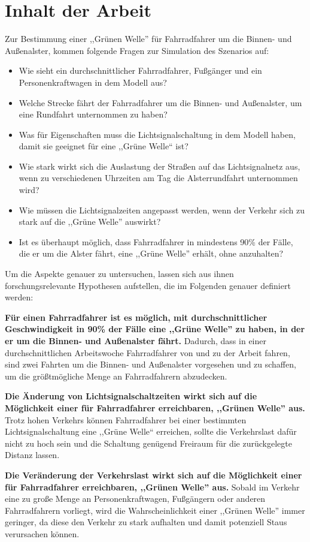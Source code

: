 %
%
\section{Inhalt der Arbeit}\label{sec:theses}

Zur Bestimmung einer ,,Grünen Welle'' für Fahrradfahrer um die Binnen- und Außenalster, kommen folgende Fragen zur Simulation des Szenarios auf:

\begin{itemize}
    \item Wie sieht ein durchschnittlicher Fahrradfahrer, Fußgänger und ein Personenkraftwagen in dem Modell aus?
    \item Welche Strecke fährt der Fahrradfahrer um die Binnen- und Außenalster, um eine Rundfahrt unternommen zu haben?
    \item Was für Eigenschaften muss die Lichtsignalschaltung in dem Modell haben, damit sie geeignet für eine ,,Grüne Welle`` ist?
    \item Wie stark wirkt sich die Auslastung der Straßen auf das Lichtsignalnetz aus, wenn zu verschiedenen Uhrzeiten am Tag die Alsterrundfahrt unternommen wird?
    \item Wie müssen die Lichtsignalzeiten angepasst werden, wenn der Verkehr sich zu stark auf die ,,Grüne Welle'' auswirkt?
    \item Ist es überhaupt möglich, dass Fahrradfahrer in mindestens 90\% der Fälle, die er um die Alster fährt, eine ,,Grüne Welle'' erhält, ohne anzuhalten?
\end{itemize}

Um die Aspekte genauer zu untersuchen, lassen sich aus ihnen forschungsrelevante Hypothesen aufstellen, die im Folgenden genauer definiert werden:

\textbf{Für einen Fahrradfahrer ist es möglich, mit durchschnittlicher Geschwindigkeit in 90\% der Fälle eine ,,Grüne Welle'' zu haben, in der er um die Binnen- und Außenalster fährt.}
Dadurch, dass in einer durchschnittlichen Arbeitswoche Fahrradfahrer von und zu der Arbeit fahren, sind zwei Fahrten um die Binnen- und Außenalster vorgesehen und zu schaffen, um die größtmögliche Menge an Fahrradfahrern abzudecken.

\textbf{Die Änderung von Lichtsignalschaltzeiten wirkt sich auf die Möglichkeit einer für Fahrradfahrer erreichbaren, ,,Grünen Welle'' aus.}
Trotz hohen Verkehrs können Fahrradfahrer bei einer bestimmten Lichtsignalschaltung eine ,,Grüne Welle`` erreichen, sollte die Verkehrslast dafür nicht zu hoch sein und die Schaltung genügend Freiraum für die zurückgelegte Distanz lassen.

\textbf{Die Veränderung der Verkehrslast wirkt sich auf die Möglichkeit einer für Fahrradfahrer erreichbaren, ,,Grünen Welle'' aus.}
Sobald im Verkehr eine zu große Menge an Personenkraftwagen, Fußgängern oder anderen Fahrradfahrern vorliegt, wird die Wahrscheinlichkeit einer ,,Grünen Welle'' immer geringer, da diese den Verkehr zu stark aufhalten und damit potenziell Staus verursachen können.
